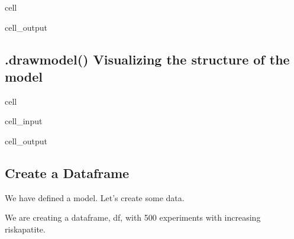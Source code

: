 \documentclass[letterpaper,10pt,english]{jupyterBook}
\begin{document}
\begin{sphinxuseclass}{cell}
\begin{sphinxVerbatimOutput}
\begin{sphinxuseclass}{cell_output}
\end{sphinxuseclass}\end{sphinxVerbatimOutput}

\end{sphinxuseclass}

\subsection{.drawmodel() Visualizing the structure of the model}
\label{\detokenize{content/howto/optimization/Optimize_simpel:drawmodel-visualizing-the-structure-of-the-model}}
\begin{sphinxuseclass}{cell}\begin{sphinxVerbatimInput}

\begin{sphinxuseclass}{cell_input}
\begin{sphinxVerbatim}[commandchars=\\\{\}]
\end{sphinxVerbatim}

\end{sphinxuseclass}\end{sphinxVerbatimInput}
\begin{sphinxVerbatimOutput}

\begin{sphinxuseclass}{cell_output}
\noindent{}

\end{sphinxuseclass}\end{sphinxVerbatimOutput}

\end{sphinxuseclass}

\subsection{Create a Dataframe}
\label{\detokenize{content/howto/optimization/Optimize_simpel:create-a-dataframe}}
\sphinxAtStartPar
We have defined a model. Let’s create some data.

\sphinxAtStartPar
We are creating a  dataframe, df, with 500 experiments with increasing risk\sphinxhyphen{}apatite.
\end{document}
